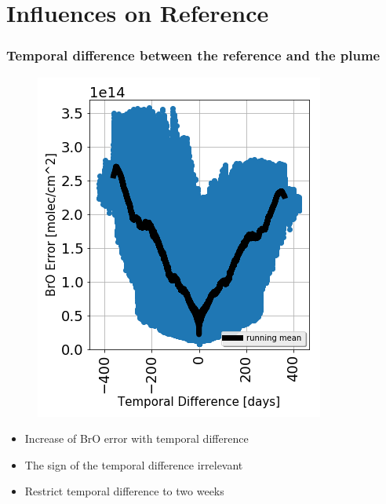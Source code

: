 \documentclass{beamer} %
\begin{document}
		\section{Influences on Reference}
		\begin{frame}
			\frametitle{\color{mygreen}Temporal difference between the reference and the plume \\%
				\color{mygreen}{\rule{0.8\textwidth}{2pt}}}
			\vspace{-0.2cm}
			\begin{multicols}{2}
				
				\begin{figure}
					\centering
					\includegraphics[width=1.05\linewidth]{../../Bilder/Datum}
					\label{fig:Datum}
				\end{figure}
				\newpage
				\vspace*{0.5cm}
				\begin{itemize}
					\item Increase of BrO error with temporal difference
					\item The sign of the temporal difference irrelevant
					\item Restrict temporal difference to two weeks
				\end{itemize}
			\end{multicols}
			
		\end{frame}
		
\end{document}
